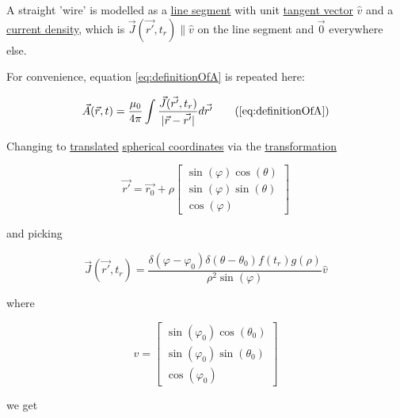 ﻿\documentclass{article}
\begin{document}
A straight 'wire' is modelled as a \href{https://en.wikipedia.org/wiki/Line_segment}{line segment} with unit \href{https://en.wikipedia.org/wiki/Tangent_vector}{tangent vector} $\hat{v}$ and a \href{https://en.wikipedia.org/wiki/Current_density}{current density}, which is $\vec{J}(\vec{r'}, t_r) \parallel \hat{v}$ on the line segment and $\vec{0}$ everywhere else.

For convenience, equation \ref{eq:definitionOfA} is repeated here:

\begin{equation*}
    \vec{A}(\vec{r}, t) = \frac{\mu_0}{4 \pi} \int \frac{\vec{J}(\vec{r'}, t_r)}{|\vec{r} - \vec{r'}|} d \vec{r'}
    \tag{\ref{eq:definitionOfA}}
\end{equation*}

Changing to \href{https://en.wikipedia.org/wiki/Translation_(geometry)}{translated} \href{https://en.wikipedia.org/wiki/Spherical_coordinate_system}{spherical coordinates} via the \href{https://en.wikipedia.org/wiki/Coordinate_system#Transformations}{transformation}

\begin{equation}
    \label{eq:translatedSphericalCoordinatesForStraightWire}
    \vec{r'} = \vec{r_0} + \rho  
    \begin{bmatrix}
    \sin(\varphi) \cos(\theta) \\
    \sin(\varphi) \sin(\theta) \\
    \cos(\varphi)
    \end{bmatrix}
\end{equation}

and picking

\begin{equation}
    \label{eq:JForStraightWire}
    \vec{J}(\vec{r'}, t_r) = \frac{\delta(\varphi - \varphi_0) \delta(\theta - \theta_0) f(t_r) g(\rho)}{\rho^2 \sin(\varphi)} \hat{v}
\end{equation}

where

\begin{equation}
    \label{eq:vForStraightWire}
    \hat{v} = 
    \begin{bmatrix}
    \sin(\varphi_0) \cos(\theta_0) \\
    \sin(\varphi_0) \sin(\theta_0) \\
    \cos(\varphi_0)
    \end{bmatrix}
\end{equation}

we get
\end{document}
